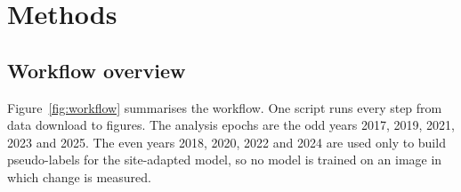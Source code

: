 \documentclass[pdflatex,sn-mathphys-num]{sn-jnl}%
\theoremstyle{thmstyleone}%
\theoremstyle{thmstyletwo}%
\theoremstyle{thmstylethree}%
\begin{document}
\section{Methods}\label{sec3}

\subsection{Workflow overview}\label{subsec3.1}

Figure~\ref{fig:workflow} summarises the workflow. One script runs every step from data download to figures. The analysis epochs are the odd years 2017, 2019, 2021, 2023 and 2025. The even years 2018, 2020, 2022 and 2024 are used only to build pseudo-labels for the site-adapted model, so no model is trained on an image in which change is measured.
\end{document}
